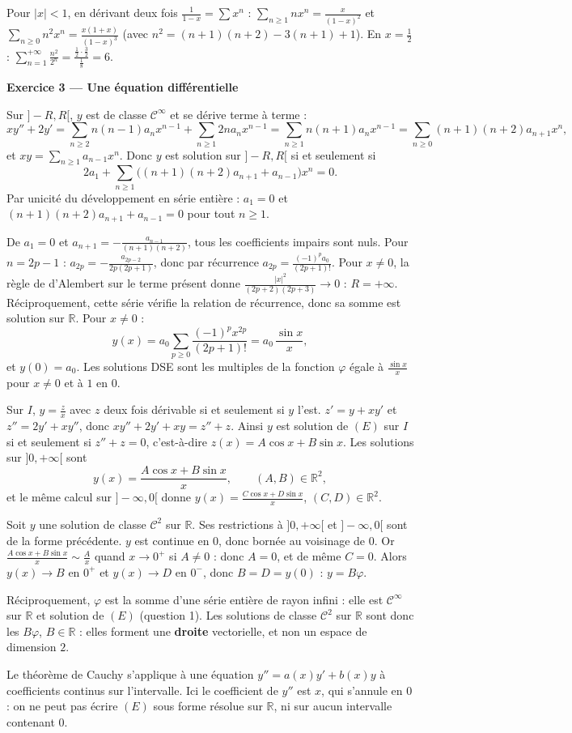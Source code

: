 \documentclass[a4paper,11pt]{article}
\numberwithin{equation}{section}
\numberwithin{figure}{section}
\numberwithin{table}{section}
\theoremstyle{enonce}
\theoremstyle{exemple}
\theoremstyle{remarque}
\newcommand{\R}{\mathbb{R}}
\newcommand{\Partie}[1]{\par\needspace{5\baselineskip}\vspace{1.1em}\noindent
  {\sffamily\bfseries\large\color{Bleu}#1}\par\vspace{2pt}{\color{Filet}\rule{\linewidth}{0.4pt}}\par\smallskip}
\newcommand{\Q}[1]{\par\needspace{3\baselineskip}\medskip\noindent{\sffamily\bfseries\color{Bleu}#1}\enspace}
\begin{document}
\Q{4.} Pour $|x|<1$, en dérivant deux fois $\frac1{1-x}=\sum x^n$ : $\sum_{n\geq1}nx^n=\frac x{(1-x)^2}$ et $\sum_{n\geq0}n^2x^n=\frac{x(1+x)}{(1-x)^3}$
(avec $n^2=(n+1)(n+2)-3(n+1)+1$). En $x=\frac12$ : $\displaystyle\sum_{n=1}^{+\infty}\frac{n^2}{2^n}=\frac{\frac12\cdot\frac32}{\frac18}=6$.

\Partie{Exercice 3 — Une équation différentielle}

\Q{1.(a)} Sur $]-R,R[$, $y$ est de classe $\mathcal C^\infty$ et se dérive terme à terme :
\[xy''+2y'=\sum_{n\geq2}n(n-1)a_nx^{n-1}+\sum_{n\geq1}2na_nx^{n-1}=\sum_{n\geq1}n(n+1)a_nx^{n-1}=\sum_{n\geq0}(n+1)(n+2)a_{n+1}x^n,\]
et $xy=\sum_{n\geq1}a_{n-1}x^n$. Donc $y$ est solution sur $]-R,R[$ si et seulement si
\[2a_1+\sum_{n\geq1}\big((n+1)(n+2)a_{n+1}+a_{n-1}\big)x^n=0.\]
Par unicité du développement en série entière : $a_1=0$ et $(n+1)(n+2)a_{n+1}+a_{n-1}=0$ pour tout $n\geq1$.

\Q{1.(b)} De $a_1=0$ et $a_{n+1}=-\frac{a_{n-1}}{(n+1)(n+2)}$, tous les coefficients impairs sont nuls. Pour $n=2p-1$ : $a_{2p}=-\frac{a_{2p-2}}{2p(2p+1)}$,
donc par récurrence $a_{2p}=\frac{(-1)^pa_0}{(2p+1)!}$. Pour $x\neq0$, la règle de d'Alembert sur le terme présent donne
$\frac{|x|^2}{(2p+2)(2p+3)}\to0$ : \textbf{$R=+\infty$}. Réciproquement, cette série vérifie la relation de récurrence, donc sa somme est solution
sur $\R$. Pour $x\neq0$ :
\[y(x)=a_0\sum_{p\geq0}\frac{(-1)^px^{2p}}{(2p+1)!}=a_0\,\frac{\sin x}x,\]
et $y(0)=a_0$. Les solutions DSE sont les multiples de la fonction $\varphi$ égale à $\frac{\sin x}x$ pour $x\neq0$ et à $1$ en $0$.

\Q{2.} Sur $I$, $y=\frac zx$ avec $z$ deux fois dérivable si et seulement si $y$ l'est. $z'=y+xy'$ et $z''=2y'+xy''$, donc
$xy''+2y'+xy=z''+z$. Ainsi $y$ est solution de $(E)$ sur $I$ si et seulement si $z''+z=0$, c'est-à-dire $z(x)=A\cos x+B\sin x$. Les solutions
sur $]0,+\infty[$ sont
\[y(x)=\frac{A\cos x+B\sin x}x,\qquad(A,B)\in\R^2,\]
et le même calcul sur $]-\infty,0[$ donne $y(x)=\frac{C\cos x+D\sin x}x$, $(C,D)\in\R^2$.

\Q{3.} Soit $y$ une solution de classe $\mathcal C^2$ sur $\R$. Ses restrictions à $]0,+\infty[$ et $]-\infty,0[$ sont de la forme précédente.
$y$ est continue en $0$, donc bornée au voisinage de $0$. Or $\frac{A\cos x+B\sin x}x\sim\frac Ax$ quand $x\to0^+$ si $A\neq0$ : donc $A=0$, et de
même $C=0$. Alors $y(x)\to B$ en $0^+$ et $y(x)\to D$ en $0^-$, donc $B=D=y(0)$ : $y=B\varphi$.

Réciproquement, $\varphi$ est la somme d'une série entière de rayon infini : elle est $\mathcal C^\infty$ sur $\R$ et solution de $(E)$ (question 1).
Les solutions de classe $\mathcal C^2$ sur $\R$ sont donc les $B\varphi$, $B\in\R$ : elles forment une \textbf{droite} vectorielle, et non un espace
de dimension $2$.

Le théorème de Cauchy s'applique à une équation $y''=a(x)y'+b(x)y$ à coefficients continus sur l'intervalle. Ici le coefficient de $y''$
est $x$, qui s'annule en $0$ : on ne peut pas écrire $(E)$ sous forme résolue sur $\R$, ni sur aucun intervalle contenant $0$.
\end{document}
